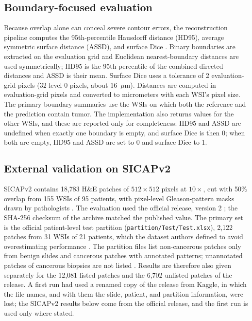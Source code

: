 \documentclass[10pt,letterpaper]{article}
\begin{document}
\subsection*{Boundary-focused evaluation}
Because overlap alone can conceal severe contour errors, the reconstruction pipeline computes the 95th-percentile Hausdorff distance (HD95), average symmetric surface distance (ASSD), and surface Dice \cite{bib42,bib43}. Binary boundaries are extracted on the evaluation grid and Euclidean nearest-boundary distances are used symmetrically; HD95 is the 95th percentile of the combined directed distances and ASSD is their mean. Surface Dice uses a tolerance of 2 evaluation-grid pixels (32 level-0 pixels, about 16~$\mu$m). Distances are computed in evaluation-grid pixels and converted to micrometers with each WSI's pixel size. The primary boundary summaries use the WSIs on which both the reference and the prediction contain tumor. The implementation also returns values for the other WSIs, and these are reported only for completeness: HD95 and ASSD are undefined when exactly one boundary is empty, and surface Dice is then 0; when both are empty, HD95 and ASSD are set to 0 and surface Dice to 1.

\subsection*{External validation on SICAPv2}
SICAPv2 contains 18,783 H\&E patches of $512\times512$ pixels at $10\times$, cut with 50\% overlap from 155 WSIs of 95 patients, with pixel-level Gleason-pattern masks drawn by pathologists \cite{bib44,bib45}. The evaluation used the official release, version 2 \cite{bib44}; the SHA-256 checksum of the archive matched the published value. The primary set is the official patient-level test partition (\texttt{partition/Test/Test.xlsx}), 2,122 patches from 31 WSIs of 21 patients, which the dataset authors defined to avoid overestimating performance \cite{bib45}. The partition files list non-cancerous patches only from benign slides and cancerous patches with annotated patterns; unannotated patches of cancerous biopsies are not listed \cite{bib44,bib45}. Results are therefore also given separately for the 12,081 listed patches and the 6,702 unlisted patches of the release. A first run had used a renamed copy of the release from Kaggle, in which the file names, and with them the slide, patient, and partition information, were lost; the SICAPv2 results below come from the official release, and the first run is used only where stated.
\end{document}
